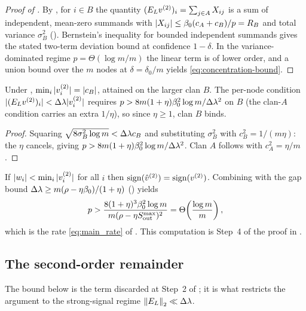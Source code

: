 \begin{proof}[Proof of ]
By , for $i\in B$ the quantity
$(E_{L}v^{(2)})_i=\sum_{j\in A}X_{ij}$ is a sum of independent, mean-zero summands with
$|X_{ij}|\le\beta_0(c_A+c_B)/p=R_B$ and total variance $\sigma_B^2$
(). Bernstein's inequality for bounded independent summands gives
the stated two-term deviation bound at confidence $1-\delta$. In the
variance-dominated regime $p=\Theta(\log m/m)$ the linear term is of lower order,
and a union bound over the $m$ nodes at $\delta=\delta_0/m$ yields
\eqref{eq:concentration-bound}.
\end{proof}

\begin{proposition}\label{prop:C-bind}
Under , $\min_i|v^{(2)}_i|=|c_B|$, attained on the larger clan $B$. The
per-node condition $|(E_{L}v^{(2)})_i|<\Delta\lambda|v^{(2)}_i|$ requires
$p>8m(1+\eta)\beta_0^2\log m/\Delta\lambda^2$ on $B$ (the clan-$A$ condition carries an extra
$1/\eta$), so since $\eta\ge1$, clan $B$ binds.
\end{proposition}
\begin{proof}
Squaring $\sqrt{8\sigma_B^2\log m}<\Delta\lambda c_B$ and substituting $\sigma_B^2$ with
$c_B^2=1/(m\eta)$: the $\eta$ cancels, giving
$p>8m(1+\eta)\beta_0^2\log m/\Delta\lambda^2$. Clan $A$ follows with $c_A^2=\eta/m$.
\end{proof}

\begin{corollary}\label{cor:C-cond}
If $|w_i|<\min_i|v^{(2)}_i|$ for all $i$ then
$\operatorname{sign}(\hat v^{(2)})=\operatorname{sign}(v^{(2)})$. Combining
 with the gap bound
$\Delta\lambda\ge m(\rho-\eta\beta_0)/(1+\eta)$ () yields
\begin{equation}\label{eq:per-node-p}
   p>\frac{8(1+\eta)^3\beta_0^2\log m}{m(\rho-\eta S_{\mathrm{out}}^{\max})^2}
    =\Theta\!\left(\frac{\log m}{m}\right),
\end{equation}
which is the rate \eqref{eq:main_rate} of . This computation is
Step~4 of the proof in .
\end{corollary}

\subsection{The second-order remainder}\label{app:comp3c}

The bound below is the term discarded at Step~2 of ; it is
what restricts the argument to the strong-signal regime $\left\lVert E_{L} \right\rVert_{2}\ll\Delta\lambda$.

